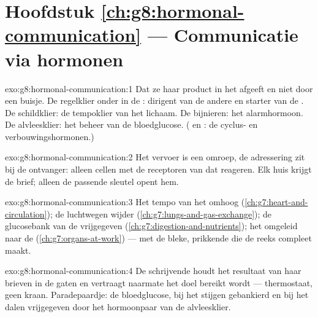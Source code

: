 \section*{Hoofdstuk \ref{ch:g8:hormonal-communication} --- Communicatie via hormonen}

\begin{solution}{exo:g8:hormonal-communication:1}
Dat ze haar product in het  afgeeft en niet door een buisje. De
regelklier onder in de : dirigent van de andere en starter van de
. De schildklier: de tempoklier van het lichaam. De bijnieren:
het alarmhormoon. De alvleesklier: het beheer van de bloedglucose.
( en : de cyclus- en verbouwingshormonen.)
\end{solution}

\begin{solution}{exo:g8:hormonal-communication:2}
Het vervoer is een omroep, de adressering zit bij de ontvanger: alleen
cellen met de receptoren van dat  reageren. Elk huis krijgt de
brief; alleen de passende sleutel opent hem.
\end{solution}

\begin{solution}{exo:g8:hormonal-communication:3}
Het tempo van het  omhoog (\cref{ch:g7:heart-and-circulation}); de
luchtwegen wijder (\cref{ch:g7:lungs-and-gas-exchange}); de glucosebank van
de  vrijgegeven
(\cref{ch:g7:digestion-and-nutrients}); het  omgeleid naar de 
(\cref{ch:g7:organs-at-work}) --- met de bleke, prikkende  die de reeks
compleet maakt.
\end{solution}

\begin{solution}{exo:g8:hormonal-communication:4}
De schrijvende  houdt het resultaat van haar brieven in de gaten en
vertraagt naarmate het doel bereikt wordt --- thermostaat, geen kraan.
Paradepaardje: de bloedglucose, bij het stijgen gebankierd en bij het dalen
vrijgegeven door het hormoonpaar van de alvleesklier.
\end{solution}

